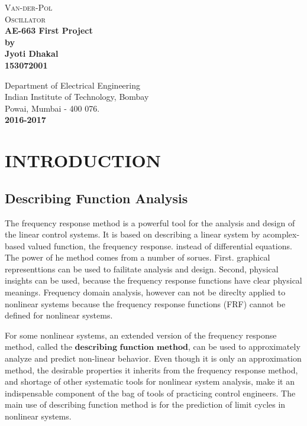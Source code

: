 \documentclass[11pt,a4 paper]{report}
\begin{document}
\begin{titlepage}
\begin{center}
    	\huge{\textsc{Van-der-Pol}} \\
    	\huge{\textsc{Oscillator}} \\[1.5cm]
    	
	\large{\textbf {AE-663 First Project}}\\[15pt]
	\large{\textbf {by}}\\[8pt]
    \large{\textbf{Jyoti Dhakal}}\\[8pt]
	\large{\textbf{153072001}}\\
    
	\vspace{1cm}
	

	Department of Electrical Engineering\\
	Indian Institute of Technology, Bombay\\
	Powai, Mumbai - 400 076.\\[0.5cm]
	\textbf{2016-2017}
\end{center} 
\end{titlepage}

\tableofcontents
\listoffigures
\onehalfspacing
\chapter{INTRODUCTION}
\section{Describing Function Analysis}
The frequency response method is a powerful tool for the analysis and design of the linear control systems. It is based on describing a linear system by acomplex-based valued function, the frequency response. instead of differential equations. The power of he method comes from a number of sorues. First. graphical representtions can be used to failitate analysis and design. Second, physical insights can be used, because the frequency response functions have clear physical meanings. Frequency domain analysis, however can not be direclty applied to nonlinear systems because the frequency response functions (FRF) cannot be defined for nonlinear systems.

\par 
For some nonlinear systems, an extended version of the frequency response method, called the $\textbf{describing function method}$, can be used to approximately analyze and predict non-linear behavior. Even though it is only an approximation method, the desirable properties it inherits from the frequency response method, and shortage of other systematic tools for nonlinear system analysis, make it an indispensable component of the bag of tools of practicing control engineers. The main use of describing function method is for the prediction of limit cycles in nonlinear systems. 
\end{document}
